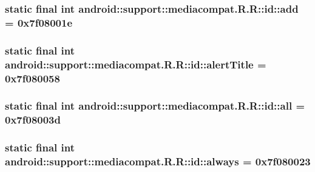 \hypertarget{classandroid_1_1support_1_1mediacompat_1_1_r_1_1id_37870f4088a901ed02950f30d26361db}{
\subsubsection[{add}]{\setlength{\rightskip}{0pt plus 5cm}static final int android::support::mediacompat.R.R::id::add = 0x7f08001e}}
\label{classandroid_1_1support_1_1mediacompat_1_1_r_1_1id_37870f4088a901ed02950f30d26361db}


\hypertarget{classandroid_1_1support_1_1mediacompat_1_1_r_1_1id_1c169965115f94b949630eca39da7f6d}{
\subsubsection[{alertTitle}]{\setlength{\rightskip}{0pt plus 5cm}static final int android::support::mediacompat.R.R::id::alertTitle = 0x7f080058}}
\label{classandroid_1_1support_1_1mediacompat_1_1_r_1_1id_1c169965115f94b949630eca39da7f6d}


\hypertarget{classandroid_1_1support_1_1mediacompat_1_1_r_1_1id_b408c3667641fc7625cc298506308f9e}{
\subsubsection[{all}]{\setlength{\rightskip}{0pt plus 5cm}static final int android::support::mediacompat.R.R::id::all = 0x7f08003d}}
\label{classandroid_1_1support_1_1mediacompat_1_1_r_1_1id_b408c3667641fc7625cc298506308f9e}


\hypertarget{classandroid_1_1support_1_1mediacompat_1_1_r_1_1id_f3c54afcf7cb61fcd2ee8490ad0d0749}{
\subsubsection[{always}]{\setlength{\rightskip}{0pt plus 5cm}static final int android::support::mediacompat.R.R::id::always = 0x7f080023}}
\label{classandroid_1_1support_1_1mediacompat_1_1_r_1_1id_f3c54afcf7cb61fcd2ee8490ad0d0749}



